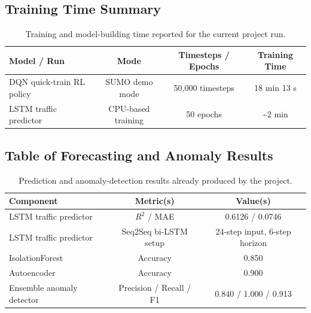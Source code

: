 \documentclass[conference]{IEEEtran}
\begin{document}
\subsection{Training Time Summary}
\begin{table}[t]
\centering
\caption{Training and model-building time reported for the current project run.}
\label{tab:training-time}
\begin{tabular}{lccc}
\toprule
\textbf{Model / Run} & \textbf{Mode} & \textbf{Timesteps / Epochs} & \textbf{Training Time} \\
\midrule
DQN quick-train RL policy & SUMO demo mode & 50,000 timesteps & 18 min 13 s \\
LSTM traffic predictor & CPU-based training & 50 epochs & \textasciitilde 2 min \\
\bottomrule
\end{tabular}
\end{table}

\subsection{Table of Forecasting and Anomaly Results}
\begin{table}[t]
\centering
\caption{Prediction and anomaly-detection results already produced by the project.}
\label{tab:ml-results}
\begin{tabular}{lcc}
\toprule
\textbf{Component} & \textbf{Metric(s)} & \textbf{Value(s)} \\
\midrule
LSTM traffic predictor & $R^2$ / MAE & 0.6126 / 0.0746 \\
LSTM traffic predictor & Seq2Seq bi-LSTM setup & 24-step input, 6-step horizon \\
IsolationForest & Accuracy & 0.850 \\
Autoencoder & Accuracy & 0.900 \\
Ensemble anomaly detector & Precision / Recall / F1 & 0.840 / 1.000 / 0.913 \\
\bottomrule
\end{tabular}
\end{table}
\end{document}
